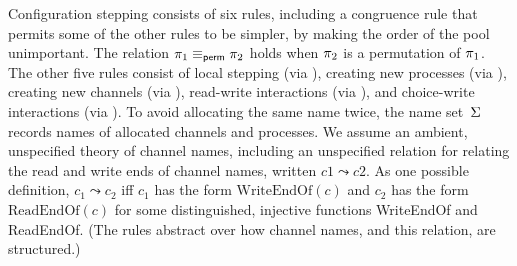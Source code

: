 Configuration stepping consists of six rules, including a congruence
rule  that permits some of the other rules to be simpler, by making
the order of the pool unimportant. The relation
$\pi_1 \equiv_\textsf{perm} \pi_2$ holds when $\pi_2$ is a permutation of
$\pi_1$.
%
The other five rules consist of local stepping (via ),
creating new processes (via ),
creating new channels (via ),
read-write interactions (via ),
and choice-write interactions (via ).
%
To avoid allocating the same name twice, 
the name set~$\Sigma$ records names of allocated channels and processes.
%
We assume an ambient, unspecified theory of channel names, including an
unspecified relation for relating the read and write ends of channel names,
written $c1 \leadsto c2$. As one possible definition, $c_1 \leadsto c_2$ iff $c_1$ has the
form $\textrm{WriteEndOf}(c)$ and $c_2$ has the form $\textrm{ReadEndOf}(c)$ for
some distinguished, injective functions WriteEndOf and ReadEndOf.
%
(The rules abstract over how channel names, and this relation, are structured.)



